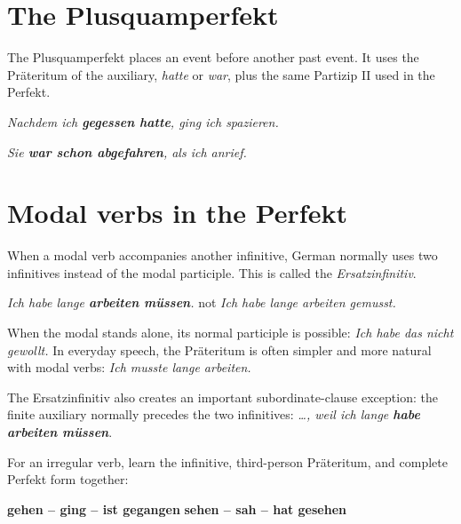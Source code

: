 \section{The Plusquamperfekt}

The Plusquamperfekt places an event before another past event. It uses the
Präteritum of the auxiliary, \textit{hatte} or \textit{war}, plus the same
Partizip II used in the Perfekt.

\begin{center}
\textit{Nachdem ich \textbf{gegessen hatte}, ging ich spazieren.}

\textit{Sie \textbf{war schon abgefahren}, als ich anrief.}
\end{center}

\section{Modal verbs in the Perfekt}

When a modal verb accompanies another infinitive, German normally uses two
infinitives instead of the modal participle. This is called the
\textit{Ersatzinfinitiv}.

\begin{center}
\textit{Ich habe lange \textbf{arbeiten müssen}.}
\qquad
not \quad \textit{Ich habe lange arbeiten gemusst.}
\end{center}

When the modal stands alone, its normal participle is possible:
\textit{Ich habe das nicht gewollt.} In everyday speech, the Präteritum is
often simpler and more natural with modal verbs:
\textit{Ich musste lange arbeiten.}

The Ersatzinfinitiv also creates an important subordinate-clause exception:
the finite auxiliary normally precedes the two infinitives:
\textit{\ldots{}, weil ich lange \textbf{habe arbeiten müssen}}.

\begin{tcolorbox}[
  colback=referenceRedBg,
  colframe=genderFeminine,
  title={Three forms to learn together},
  fonttitle=\bfseries
]
For an irregular verb, learn the infinitive, third-person Präteritum, and
complete Perfekt form together:

\begin{center}
\textbf{gehen -- ging -- ist gegangen}
\qquad
\textbf{sehen -- sah -- hat gesehen}
\end{center}
\end{tcolorbox}
